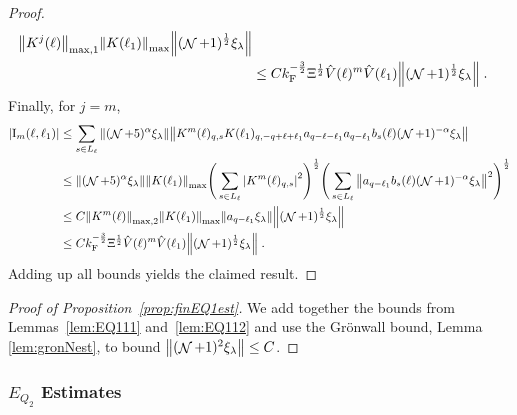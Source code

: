 \documentclass[12pt,a4paper]{article}
\numberwithin{equation}{section}
\newcommand{\1}{\mathbb{I}}
\newcommand{\F}{\mathrm{F}}
\newcommand{\I}{\mathrm{I}}
\DeclareMathOperator{\NN}{\mathcal{N}}
\newcommand{\half}{\frac{1}{2}}
\theoremstyle{plain}
\theoremstyle{definition}
\theoremstyle{remark}
\theoremstyle{plain}
\theoremstyle{definition}
\theoremstyle{remark}
\begin{document}
\begin{proof}
\begin{align}
		\norm{ K^{j}(\ell)}_{\mathrm{max,1}}
		\norm{ K(\ell_1) }_{\max}
		\norm{(\NN+1)^\half \xi_\lambda } \nonumber \\
	&\leq C k_{\F}^{-\frac 32} \Xi^\half
		\hat{V}(\ell)^m
		\hat{V}(\ell_1)
		\norm{(\NN+1)^\half \xi_\lambda } \;.
\end{align}
Finally, for $ j = m $,
\begin{align}
	|\I_m(\ell, \ell_1)| 
	&\leq \sum\limits_{s \in L_{\ell}} \norm{(\NN+5)^{\alpha} \xi_\lambda}\norm{ K^m(\ell)_{q,s} K(\ell_1)_{q,-q+\ell+\ell_1} a_{q-\ell-\ell_1} a_{q-\ell_1} b_{s}(\ell) (\NN+1)^{-\alpha} \xi_\lambda } \nonumber\\
	&\leq \norm{(\NN+5)^{\alpha} \xi_\lambda} \norm{K(\ell_1)}_{\max} \Bigg( \sum\limits_{s \in L_{\ell}} \abs{K^m(\ell)_{q,s}}^2\Bigg)^\half \Bigg(\sum\limits_{s \in L_{\ell}} \norm{ a_{q-\ell_1} b_s(\ell) (\NN+1)^{-\alpha} \xi_\lambda  }^2\Bigg)^\half \nonumber\\
	&\leq C \norm{K^m(\ell)}_{\mathrm{max,2}} \norm{K(\ell_1)}_{\max} \norm{a_{q-\ell_1} \xi_\lambda } \norm{(\NN+1)^\half \xi_\lambda}\nonumber\\
	&\leq C k_{\F}^{-\frac 32} \Xi^\half
		\hat{V}(\ell)^m
		\hat{V}(\ell_1)
		\norm{(\NN+1)^\half \xi_\lambda } \;. \label{eq:estEQ1123}
\end{align}
Adding up all bounds yields the claimed result.
\end{proof}



\begin{proof}[Proof of Proposition~\ref{prop:finEQ1est}]
We add together the bounds from Lemmas~\ref{lem:EQ111} and~\ref{lem:EQ112} and use the Gr\"onwall bound, Lemma \ref{lem:gronNest}, to bound $ \norm{(\NN+1)^2 \xi_\lambda} \le C $.
\end{proof}





\subsubsection{$E_{Q_2}$ Estimates}
\end{document}
